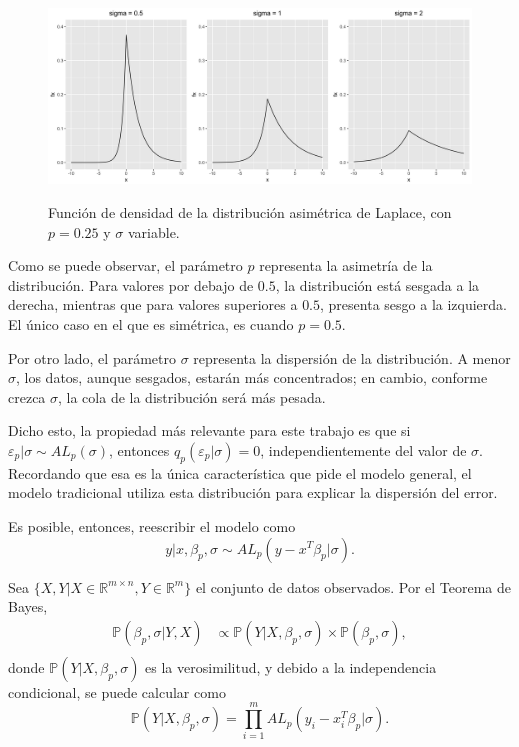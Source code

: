 \begin{figure}[H]
	\centering
	\caption{Funci\'on de densidad de la distribuci\'on asim\'etrica de Laplace, con $p = 0.25$ y $\sigma$ variable.}
	\includegraphics[width=1\textwidth]{Figures/ALD/sigma_plots.png}
	\label{p_plots}
\end{figure}

Como se puede observar, el par\'ametro $p$ representa la asimetr\'ia de la distribuci\'on. Para valores por debajo de $0.5$, la distribuci\'on est\'a sesgada a la derecha, mientras que para valores superiores a $0.5$, presenta sesgo a la izquierda. El \'unico caso en el que es sim\'etrica, es cuando $p = 0.5$. 

Por otro lado, el par\'ametro $\sigma$ representa la dispersi\'on de la distribuci\'on. A menor $\sigma$, los datos, aunque sesgados, estar\'an m\'as concentrados; en cambio, conforme crezca $\sigma$, la cola de la distribuci\'on ser\'a m\'as pesada.

Dicho esto, la propiedad m\'as relevante para este trabajo es que si $\varepsilon_p|\sigma \sim AL_p(\sigma)$, entonces $q_p(\varepsilon_p|\sigma) = 0$, independientemente del valor de $\sigma$. Recordando que esa es la \'unica caracter\'istica que pide el modelo general, el modelo tradicional utiliza esta distribuci\'on para explicar la dispersi\'on del error.

Es posible, entonces, reescribir el modelo como
\begin{equation*}
    y | x, \beta_p, \sigma 
    \sim 
    AL_p(y - x^T\beta_p|\sigma).
\end{equation*}

Sea $\{X,Y | X \in \mathbb{R}^{m \times n}, Y \in \mathbb{R}^m\}$ el conjunto de datos observados. Por el Teorema de Bayes,
\begin{equation*}
\begin{aligned}
    \mathbb{P}(\beta_p,\sigma | Y, X) 
    &\propto \mathbb{P}(Y| X, \beta_p, \sigma) \times \mathbb{P}(\beta_p, \sigma), \\
\end{aligned}
\end{equation*}
donde $\mathbb{P}(Y| X, \beta_p, \sigma)$ es la verosimilitud, y debido a la independencia condicional, se puede calcular como 
\begin{equation*}
    \mathbb{P}(Y| X, \beta_p, \sigma)
    =
    \prod_{i=1}^m AL_p(y_i - x_i^T\beta_p|\sigma).
\end{equation*}

